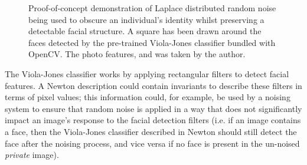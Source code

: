 \documentclass[12pt]{article}
\begin{document}
      \begin{figure}[H]
        \centering
        \caption{Proof-of-concept demonstration of Laplace distributed random noise being used to obscure an individual's identity whilst preserving a detectable facial structure. A square has been drawn around the faces detected by the pre-trained Viola-Jones classifier bundled with OpenCV. The photo features, and was taken by the author.}
        \label{fig:viola_jones}
      \end{figure}

      The Viola-Jones classifier works by applying rectangular filters to detect facial features. A Newton description could contain invariants to describe these filters in terms of pixel values; this information could, for example, be used by a noising system to ensure that random noise is applied in a way that does not significantly impact an image's response to the facial detection filters (i.e. if an image contains a face, then the Viola-Jones classifier described in Newton should still detect the face after the noising process, and vice versa if no face is present in the un-noised \textit{private} image).
\end{document}
